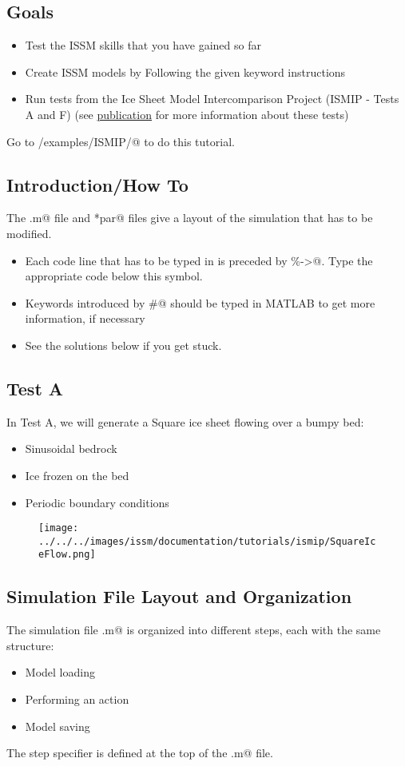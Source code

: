 \subsection{Goals} %
\begin{itemize}
	\item Test the ISSM skills that you have gained so far
	\item Create ISSM models by Following the given keyword instructions
	\item Run tests from the Ice Sheet Model Intercomparison Project (ISMIP - Tests A and F) (see \href{https://tc.copernicus.org/articles/2/95/2008/}{publication} for more information about these tests)
\end{itemize}

Go to \verb@trunk/examples/ISMIP/@ to do this tutorial.

\subsection{Introduction/How To} %
The \verb@runme.m@ file and \verb@*par@ files give a layout of the simulation that has to be modified.
\begin{itemize}
	\item Each code line that has to be typed in is preceded by \verb@\%->@. Type the appropriate code below this symbol.
	\item Keywords introduced by \verb@#@ should be typed in MATLAB to get more information, if necessary
	\item See the solutions below if you get stuck.
\end{itemize}
\subsection{Test A} %
In Test A, we will generate a Square ice sheet flowing over a bumpy bed:
\begin{itemize}
	\item Sinusoidal bedrock
	\item Ice frozen on the bed
	\item Periodic boundary conditions
\end{itemize}
\begin{figure}[H]
	\begin{center}
		\texttt{[image: ../../../images/issm/documentation/tutorials/ismip/SquareIceFlow.png]}
	\end{center}
\end{figure}
\subsection{Simulation File Layout and Organization}  %
The simulation file \verb@runme.m@ is organized into different steps, each with the same structure:
\begin{itemize}
	\item Model loading
	\item Performing an action
	\item Model saving
\end{itemize}
The step specifier \verb@steps@ is defined at the top of the \verb@runme.m@ file.
